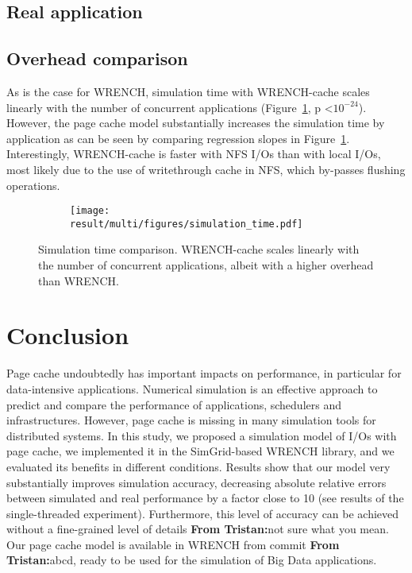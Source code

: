 \documentclass[conference]{IEEEtran}
\newcommand{\tristan}[1]{\color{orange}\textbf{From Tristan:}#1\color{black}}
\newcommand{\simgrid}{SimGrid\xspace}
\newcommand{\wrench}{WRENCH\xspace}
\begin{document}
        \subsection{Real application}

        \subsection{Overhead comparison}
        As is the case for \wrench, simulation time with \wrench-cache scales
        linearly with the number of concurrent applications
        (Figure~\ref{fig:multi_time}, p \textless $10^{-24}$). However, the page
        cache model substantially increases the simulation time by
        application as can be seen by comparing regression slopes in
        Figure~\ref{fig:multi_time}. Interestingly, \wrench-cache is faster with 
        NFS I/Os than with local I/Os, most likely due to the use of writethrough
        cache in NFS, which by-passes flushing operations.
        \begin{figure}
            \begin{subfigure}{\columnwidth}
                \centering
                \texttt{[image: result/multi/figures/simulation\_time.pdf]}
            \end{subfigure}
            \caption{Simulation time comparison. \wrench-cache scales
            linearly with the number of concurrent applications, albeit
            with a higher overhead than \wrench.}
            \label{fig:multi_time}
            \end{figure}


    \section{Conclusion}
    \label{discussion}
        Page cache undoubtedly has important impacts on performance, in
        particular for data-intensive applications. Numerical simulation is
        an effective approach to predict and compare the performance of
        applications, schedulers and infrastructures. However, page cache
        is missing in many simulation tools for distributed systems. In
        this study, we proposed a simulation model of I/Os with page cache,
        we implemented it in the \simgrid-based \wrench library, and we
        evaluated its benefits in different conditions. Results show that
        our model very substantially improves simulation accuracy,
        decreasing absolute relative errors between simulated and real
        performance by a factor close to 10 (see results of the
        single-threaded experiment). Furthermore, this level of accuracy
        can be achieved without a fine-grained level of details
        \tristan{not sure what you mean}. Our page cache model is available
        in \wrench from commit \tristan{abcd}, ready to be used for the
        simulation of Big Data applications.
\end{document}
